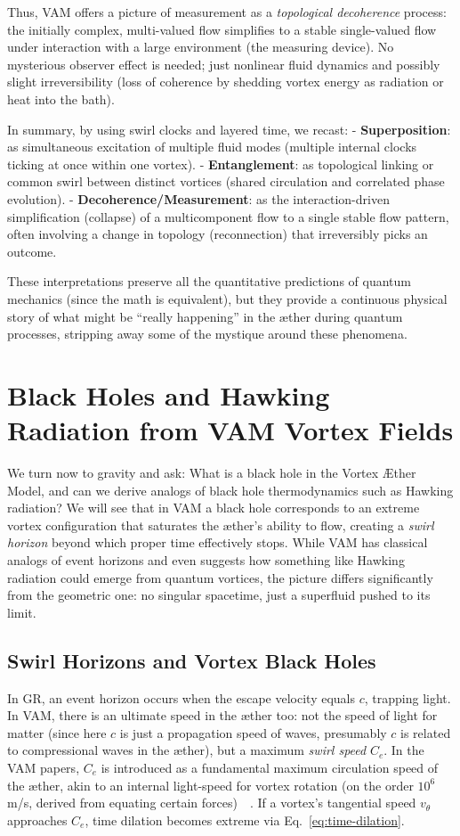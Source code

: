 \documentclass[preprint]{revtex4-2}
\begin{document}
    Thus, VAM offers a picture of measurement as a \emph{topological decoherence} process: the initially complex, multi-valued flow simplifies to a stable single-valued flow under interaction with a large environment (the measuring device). No mysterious observer effect is needed; just nonlinear fluid dynamics and possibly slight irreversibility (loss of coherence by shedding vortex energy as radiation or heat into the bath).

    In summary, by using swirl clocks and layered time, we recast:
    - \textbf{Superposition}: as simultaneous excitation of multiple fluid modes (multiple internal clocks ticking at once within one vortex).
    - \textbf{Entanglement}: as topological linking or common swirl between distinct vortices (shared circulation and correlated phase evolution).
    - \textbf{Decoherence/Measurement}: as the interaction-driven simplification (collapse) of a multicomponent flow to a single stable flow pattern, often involving a change in topology (reconnection) that irreversibly picks an outcome.

    These interpretations preserve all the quantitative predictions of quantum mechanics (since the math is equivalent), but they provide a continuous physical story of what might be “really happening” in the æther during quantum processes, stripping away some of the mystique around these phenomena.

\section{Black Holes and Hawking Radiation from VAM Vortex Fields}
    We turn now to gravity and ask: What is a black hole in the Vortex Æther Model, and can we derive analogs of black hole thermodynamics such as Hawking radiation? We will see that in VAM a black hole corresponds to an extreme vortex configuration that saturates the æther’s ability to flow, creating a \emph{swirl horizon} beyond which proper time effectively stops. While VAM has classical analogs of event horizons and even suggests how something like Hawking radiation could emerge from quantum vortices, the picture differs significantly from the geometric one: no singular spacetime, just a superfluid pushed to its limit.

    \subsection{Swirl Horizons and Vortex Black Holes}
    In GR, an event horizon occurs when the escape velocity equals $c$, trapping light. In VAM, there is an ultimate speed in the æther too: not the speed of light for matter (since here $c$ is just a propagation speed of waves, presumably $c$ is related to compressional waves in the æther), but a maximum \emph{swirl speed} $C_e$. In the VAM papers, $C_e$ is introduced as a fundamental maximum circulation speed of the æther, akin to an internal light-speed for vortex rotation (on the order $10^6$ m/s, derived from equating certain forces)~\cite{reference_115}~\cite{reference_116}. If a vortex’s tangential speed $v_\theta$ approaches $C_e$, time dilation becomes extreme via Eq.~\eqref{eq:time-dilation}.
\end{document}
